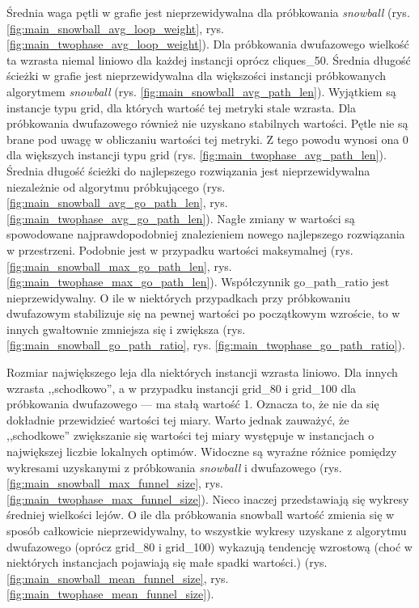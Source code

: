 Średnia waga pętli w grafie jest nieprzewidywalna dla próbkowania \textit{snowball} (rys. \ref{fig:main_snowball_avg_loop_weight}, rys. \ref{fig:main_twophase_avg_loop_weight}).
Dla próbkowania dwufazowego wielkość ta wzrasta niemal liniowo dla każdej instancji oprócz cliques\_50.
Średnia długość ścieżki w grafie jest nieprzewidywalna dla większości instancji próbkowanych algorytmem \textit{snowball} (rys. \ref{fig:main_snowball_avg_path_len}).
Wyjątkiem są instancje typu grid, dla których wartość tej metryki stale wzrasta.
Dla próbkowania dwufazowego również nie uzyskano stabilnych wartości.
Pętle nie są brane pod uwagę w obliczaniu wartości tej metryki. Z tego powodu wynosi ona 0 dla większych instancji typu grid (rys. \ref{fig:main_twophase_avg_path_len}).
Średnia długość ścieżki do najlepszego rozwiązania jest nieprzewidywalna niezależnie od algorytmu próbkującego (rys. \ref{fig:main_snowball_avg_go_path_len}, rys. \ref{fig:main_twophase_avg_go_path_len}).
Nagłe zmiany w wartości są spowodowane najprawdopodobniej znalezieniem nowego najlepszego rozwiązania w przestrzeni.
Podobnie jest w przypadku wartości maksymalnej (rys. \ref{fig:main_snowball_max_go_path_len}, rys. \ref{fig:main_twophase_max_go_path_len}).
Współczynnik go\_path\_ratio jest nieprzewidywalny. O ile w niektórych przypadkach przy próbkowaniu dwufazowym stabilizuje się na pewnej wartości
po początkowym wzroście, to w innych gwałtownie zmniejsza się i zwiększa (rys. \ref{fig:main_snowball_go_path_ratio}, rys. \ref{fig:main_twophase_go_path_ratio}).

Rozmiar największego leja dla niektórych instancji wzrasta liniowo. Dla innych wzrasta ,,schodkowo'', a w przypadku instancji grid\_80 i grid\_100 dla
próbkowania dwufazowego --- ma stałą wartość 1. Oznacza to, że nie da się dokładnie przewidzieć wartości tej miary. Warto jednak zauważyć, że
,,schodkowe'' zwiększanie się wartości tej miary występuje w instancjach o największej liczbie lokalnych optimów.
Widoczne są wyraźne różnice pomiędzy wykresami uzyskanymi z próbkowania \textit{snowball} i dwufazowego (rys. \ref{fig:main_snowball_max_funnel_size}, rys. \ref{fig:main_twophase_max_funnel_size}).
Nieco inaczej przedstawiają się wykresy średniej wielkości lejów. O ile dla próbkowania snowball wartość zmienia się w sposób całkowicie nieprzewidywalny,
to wszystkie wykresy uzyskane z algorytmu dwufazowego (oprócz grid\_80 i grid\_100) wykazują tendencję wzrostową (choć w niektórych instancjach pojawiają się małe spadki wartości.)
(rys. \ref{fig:main_snowball_mean_funnel_size}, rys. \ref{fig:main_twophase_mean_funnel_size}).

